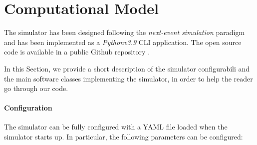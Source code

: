 \section{Computational Model}
\label{sec:performance-modeling-computational-model}
The simulator has been designed following the \textit{next-event simulation} paradigm \cite{leemis2006discrete} and has been implemented as a \textit{Pythonv3.9} CLI application. 
The open source code is available in a public Github repository \cite{gmarciani-pydes}.

In this Section, we provide a short description of the simulator configurabili and the main software classes implementing the simulator, in order to help the reader go through our code.

\paragraph{Configuration}
The simulator can be fully configured with a YAML file loaded when the simulator starts up. 
In particular, the following parameters can be configured:

